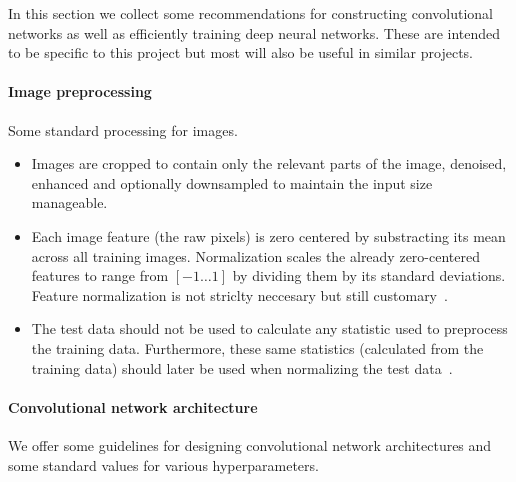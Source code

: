 In this section we collect some recommendations for constructing convolutional networks as well as efficiently training deep neural networks. These are intended to be specific to this project but most will also be useful in similar projects.


\paragraph{Image preprocessing} Some standard processing for images.
\begin{itemize}
	\item Images are cropped to contain only the relevant parts of the image, denoised, enhanced and optionally downsampled to maintain the input size manageable.
	\item Each image feature (the raw pixels) is zero centered by substracting its mean across all training images. Normalization scales the already zero-centered features to range from $[-1 \dots 1]$ by dividing them by its standard deviations. Feature normalization is not striclty neccesary but still customary~\cite{Karpathy2015}.
	\item The test data should not be used to calculate any statistic used to preprocess the training data. Furthermore, these same statistics (calculated from the training data) should later be used when normalizing the test data~\cite{Karpathy2015}.
\end{itemize}

\paragraph{Convolutional network architecture}
We offer some guidelines for designing convolutional network architectures and some standard values for various hyperparameters.

